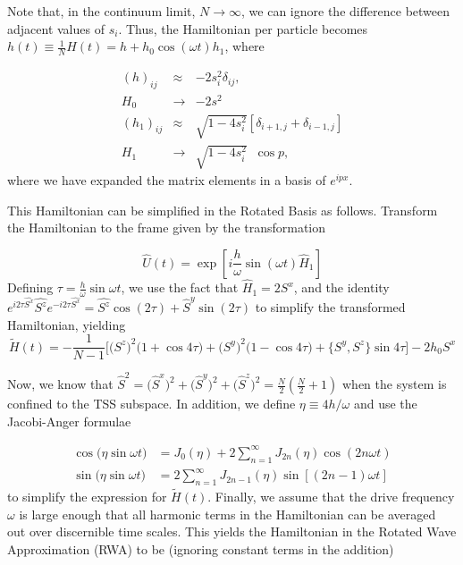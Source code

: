\documentclass{article}
\begin{document}
Note that, in the continuum limit, $N\rightarrow\infty$, we can ignore the difference between adjacent values
of $s_i$. Thus, the Hamiltonian per particle becomes $h(t)\equiv \displaystyle\frac{1}{N}H(t) = h + h_0\cos{(\omega t)}h_1$, where

\begin{eqnarray}
\left(h\right)_{ij} &\approx& - 2s^2_i \delta_{ij},\nonumber\\
H_0 &\rightarrow& -2s^2\\
\left(h_1\right)_{ij} &\approx& \sqrt{1 - 4s^2_i}\left[\delta_{i+1, j}  + \delta_{i-1,j}\right]\\
H_1 &\rightarrow& \sqrt{1 - 4s^2_i}\;\;\cos{p},
\end{eqnarray}
where we have expanded the matrix elements in a basis of $e^{ipx}$.


This Hamiltonian can be simplified in the Rotated Basis as follows. Transform the Hamiltonian to the frame given by the transformation \cite{ArnabD}

\begin{equation*}
\hat{U}(t)=\exp \left[i \frac{h}{\omega} \sin (\omega t) \hat{H}_{1}\right]
\end{equation*}
Defining $\tau = \displaystyle\frac{h}{\omega}\sin{\omega t}$, we use the fact that $\hat{H}_1 = 2 S^x$, and the identity  $e^{i 2\tau\hat{S^{x}}} \hat{S^{z}} e^{-i 2\tau \hat{S^{x}}}=\hat{S^{z}} \cos \left(2\tau\right)+\hat{S}^{y} \sin \left(2\tau\right)$ to simplify the transformed Hamiltonian, yielding
\begin{equation*}
\tilde{H}(t)= -\frac{1}{N-1}\Bigg[\big(S^z\big)^2 \big(1+\cos{4\tau}\big) + \big(S^y\big)^2 \big(1-\cos{4\tau}\big) + \big\{S^y, S^z\big\}\sin{4\tau}\Bigg] - 2 h_0 S^x
\end{equation*}

Now, we know that $\hat{S}^{2}=\big(\hat{S}^x\big)^{2}+\big(\hat{S}^y\big)^{2}+\big(\hat{S}^z\big)^{2}=\frac{N}{2}\left(\frac{N}{2}+1\right)$ when the system is confined to the TSS subspace. In addition, we define $\eta\equiv 4h/\omega$ and use the Jacobi-Anger formulae

\begin{align*}
\cos \big(\eta \sin\omega t\big) &= J_{0}(\eta)+2 \sum_{n=1}^{\infty} J_{2 n}(\eta) \cos (2 n \omega t) \\
\sin \big(\eta \sin\omega t\big) &= 2 \sum_{n=1}^{\infty} J_{2 n-1}(\eta)\sin [(2 n-1) \omega t]
\end{align*}
to simplify the expression for $\tilde{H}(t)$. Finally, we assume that the drive frequency $\omega$ is large enough that all harmonic terms in the Hamiltonian can be averaged out over discernible time scales. This yields the Hamiltonian in the Rotated Wave Approximation (RWA) to be (ignoring constant terms in the addition)
\end{document}

